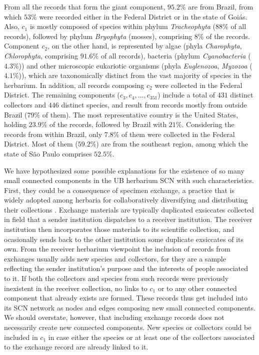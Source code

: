 From all the records that form the giant component, $95.2\%$ are from Brazil, from which $53\%$ were recorded either in the Federal District or in the state of Goiás. 
Also, $c_1$ is mostly composed of species within phylum \textit{Tracheophyta} ($88\%$ of all records), followed by phylum \textit{Bryophyta} (mosses), comprising $8\%$ of the records. 
Component $c_2$, on the other hand, is represented by algae (phyla \textit{Charophyta}, \textit{Chlorophyta}, comprising $91.6\%$ of all records), bacteria (phylum \textit{Cyanobacteria} ($4.3\%$)) and other microscopic eukariotic organisms (phyla \textit{Euglenozoa}, \textit{Myzozoa} ($4.1\%$)), which are taxonomically distinct from the vast majority of species in the herbarium.
In addition, all records composing $c_2$ were collected in the Federal District.
The remaining components ($c_3,c_4,..., c_{351}$) include a total of $431$ distinct collectors and $446$ distinct species, and result from records mostly from outside Brazil ($79\%$ of them).
The most representative country is the United States, holding $23.9\%$ of the records, followed by Brazil with $21\%$. 
Considering the records from within Brazil, only $7.8\%$ of them were collected in the Federal District. Most of them ($59.2\%$) are from the southeast region, among which the state of São Paulo comprises $52.5\%$.


We have hypothesized some possible explanations for the existence of so many small connected components in the UB herbarium SCN with such characteristics. First, they could be a consequence of specimen exchange, a practice that is widely adopted among herbaria for collaboratively diversifying and distributing their collections \cite{Groom2014}. Exchange materials are typically duplicated exsiccates collected in field that a sender institution dispatches to a receiver institution. The receiver institution then incorporates those materials to its scientific collection, and ocasionally sends back to the other institution some duplicate exsiccates of its own.
From the receiver herbarium viewpoint the inclusion of records from exchanges usually adds new species and collectors, for they are a sample reflecting the sender institution's purpose and the interests of people associated to it. If both the collectors and species from such records were previously inexistent in the receiver collection, no links to $c_1$ or to any other connected component that already exists are formed. These records thus get included into its SCN network as nodes and edges composing new small connected components. We should overstate, however, that including exchange records does not necessarily create new connected components. New species or collectors could be included in $c_1$ in case either the species or at least one of the collectors associated to the exchange record are already linked to it.

